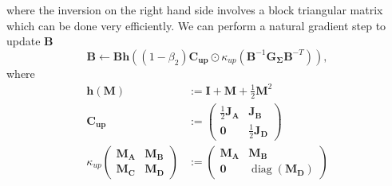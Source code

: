 \documentclass[a4paper, 11pt, oneside]{scrartcl}
\theoremstyle{break}
\DeclareMathOperator{\diag}{diag}
\newcommand{\matr}[1]{\boldsymbol{#1}}
\numberwithin{equation}{section}
\begin{document}
				where the inversion on the right hand side involves a block triangular matrix which can be done very efficiently. 
				We can perform a natural gradient step to update $\matr{B}$
				\begin{equation}
					\matr{B} \leftarrow \matr{B} \matr{h}((1 - \beta_2) \matr{C_{up}} \odot \kappa_{up}(\matr{B}^{-1} \matr{G_{\Sigma}} \matr{B}^{-T})),
				\end{equation}
				where
				\begin{align}
					\matr{h}(\matr{M}) &:= \matr{I} + \matr{M} + \frac{1}{2} \matr{M}^2 \label{eqn:h_func} \\
					\matr{C_{up}} &:= \begin{pmatrix} \frac{1}{2} \matr{J_A} & \matr{J_B} \\ \matr{0} & \frac{1}{2} \matr{J_D} \end{pmatrix} \label{eqn:C_up} \\
					\kappa_{up} \begin{pmatrix} \matr{M_A} & \matr{M_B} \\ \matr{M_C} & \matr{M_D} \end{pmatrix} &:= \begin{pmatrix} \matr{M_A} & \matr{M_B} \\ \matr{0} & \diag(\matr{M_D}) \end{pmatrix}
					\label{eqn:kappa_up}
				\end{align}
\end{document}
